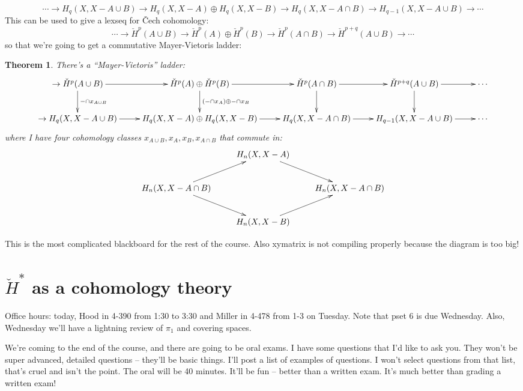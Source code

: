 \documentclass{amsart}
\theoremstyle{theorem}
\newtheorem{theorem}{Theorem}[section]
\theoremstyle{definition}
\newcommand\cHH{\check{H}}
\begin{document}
\begin{equation*}
\cdots\to H_q(X,X-A\cup B)\to H_q(X,X-A)\oplus H_q(X,X-B)\to H_q(X,X-A\cap B)\to H_{q-1}(X,X-A\cup B)\to\cdots
\end{equation*}
This can be used to give a lexseq for \v{C}ech cohomology:
\begin{equation*}
\cdots\to \cHH^p(A\cup B)\to \cHH^p(A)\oplus \cHH^p(B)\to \cHH^p(A\cap B)\to \cHH^{p+q}(A\cup B)\to\cdots
\end{equation*}
so that we're going to get a commutative Mayer-Vietoris ladder:
\begin{theorem}
There's a ``Mayer-Vietoris'' ladder:
\begin{equation*}
\xymatrix{
	\to\cHH^p(A\cup B)\ar[r]\ar[d]^{-\cap x_{A\cup B}} & \cHH^p(A)\oplus \cHH^p(B)\ar[r]\ar[d]^{(-\cap x_A)\oplus -\cap x_B} & \cHH^p(A\cap B)\ar[r]\ar[d] & \cHH^{p+q}(A\cup B)\ar[r]\ar[d] & \cdots\\
	\to H_q(X,X-A\cup B)\ar[r]& H_q(X,X-A)\oplus H_q(X,X-B)\ar[r]& H_q(X,X-A\cap B)\ar[r]& H_{q-1}(X,X-A\cup B)\ar[r]&\cdots
}
\end{equation*}
where I have four cohomology classes $x_{A \cup B},x_A,x_B,x_{A\cap B}$ that commute in:
\begin{equation*}
\xymatrix{
	 & H_n(X,X-A)\ar[dr] & \\
	H_n(X,X-A\cap B)\ar[ur]\ar[dr] & & H_n(X,X-A\cap B)\\
	 & H_n(X,X-B)\ar[ur]
}
\end{equation*}
\end{theorem}
This is the most complicated blackboard for the rest of the course. Also xymatrix is not compiling properly because the diagram is too big!
\section{$\cHH^\ast$ as a cohomology theory}
Office hours: today, Hood in 4-390 from 1:30 to 3:30 and Miller in 4-478 from 1-3 on Tuesday. Note that pset 6 is due Wednesday. Also, Wednesday we'll have a lightning review of $\pi_1$ and covering spaces.

We're coming to the end of the course, and there are going to be oral exams. I have some questions that I'd like to ask you. They won't be super advanced, detailed questions -- they'll be basic things. I'll post a list of examples of questions. I won't select questions from that list, that's cruel and isn't the point. The oral will be 40 minutes. It'll be fun -- better than a written exam. It's much better than grading a written exam!
\end{document}
